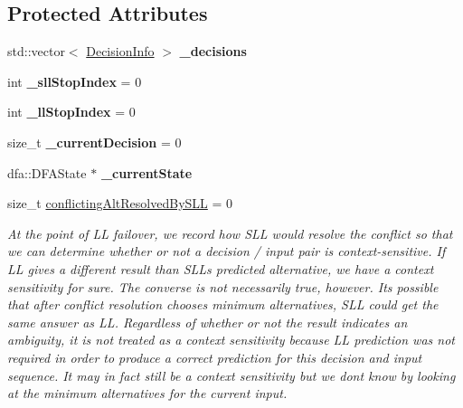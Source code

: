 \subsection*{Protected Attributes}
\begin{DoxyCompactItemize}
\item 
\mbox{\label{classantlr4_1_1atn_1_1ProfilingATNSimulator_acea790de680bb7daf232c92cd3bbeefc}} 
std\+::vector$<$ \hyperlink{classantlr4_1_1atn_1_1DecisionInfo}{Decision\+Info} $>$ {\bfseries \+\_\+decisions}
\item 
\mbox{\label{classantlr4_1_1atn_1_1ProfilingATNSimulator_ab9751cd4d23aa0ad68a39741d896fe6b}} 
int {\bfseries \+\_\+sll\+Stop\+Index} = 0
\item 
\mbox{\label{classantlr4_1_1atn_1_1ProfilingATNSimulator_afb22a963389758fb5fda5eb36f0776d2}} 
int {\bfseries \+\_\+ll\+Stop\+Index} = 0
\item 
\mbox{\label{classantlr4_1_1atn_1_1ProfilingATNSimulator_aff86eac293a5a5fe84f80c406346bfa2}} 
size\+\_\+t {\bfseries \+\_\+current\+Decision} = 0
\item 
\mbox{\label{classantlr4_1_1atn_1_1ProfilingATNSimulator_a3a404582fe9f278c4d055e93f25606b1}} 
dfa\+::\+D\+F\+A\+State $\ast$ {\bfseries \+\_\+current\+State}
\item 
size\+\_\+t \hyperlink{classantlr4_1_1atn_1_1ProfilingATNSimulator_a5bbda69bda28802f01fb9171d25b42b8}{conflicting\+Alt\+Resolved\+By\+S\+LL} = 0
\begin{DoxyCompactList}\small\item\em At the point of LL failover, we record how S\+LL would resolve the conflict so that we can determine whether or not a decision / input pair is context-\/sensitive. If LL gives a different result than S\+LL\textquotesingle{}s predicted alternative, we have a context sensitivity for sure. The converse is not necessarily true, however. It\textquotesingle{}s possible that after conflict resolution chooses minimum alternatives, S\+LL could get the same answer as LL. Regardless of whether or not the result indicates an ambiguity, it is not treated as a context sensitivity because LL prediction was not required in order to produce a correct prediction for this decision and input sequence. It may in fact still be a context sensitivity but we don\textquotesingle{}t know by looking at the minimum alternatives for the current input. \end{DoxyCompactList}\end{DoxyCompactItemize}
